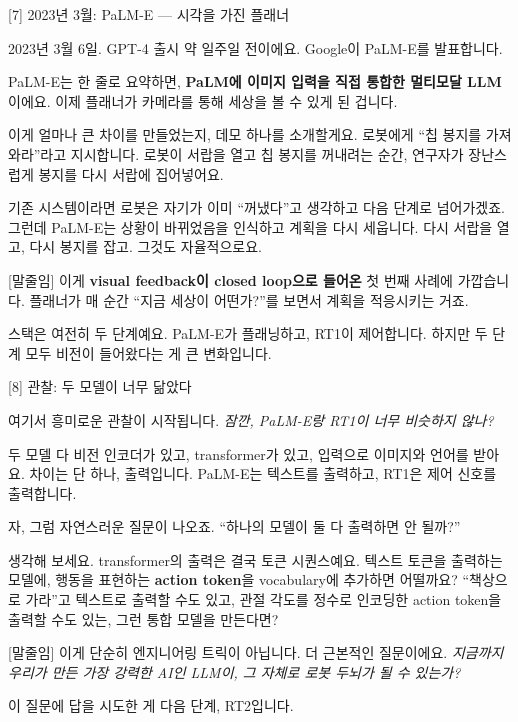 \documentclass[aspectratio=169,10pt]{beamer}
\newenvironment{script}{%
  \footnotesize
  \setlength{\parskip}{0.5em}
  \setlength{\parindent}{0pt}
}{}
\begin{document}
\begin{frame}{[7] 2023년 3월: PaLM-E --- 시각을 가진 플래너}
\begin{script}
2023년 3월 6일. GPT-4 출시 약 일주일 전이에요. Google이 PaLM-E를 발표합니다.

PaLM-E는 한 줄로 요약하면, \textbf{PaLM에 이미지 입력을 직접 통합한 멀티모달 LLM}이에요. 이제 플래너가 카메라를 통해 세상을 볼 수 있게 된 겁니다.

이게 얼마나 큰 차이를 만들었는지, 데모 하나를 소개할게요. 로봇에게 ``칩 봉지를 가져와라''라고 지시합니다. 로봇이 서랍을 열고 칩 봉지를 꺼내려는 순간, 연구자가 장난스럽게 봉지를 다시 서랍에 집어넣어요.

기존 시스템이라면 로봇은 자기가 이미 ``꺼냈다''고 생각하고 다음 단계로 넘어가겠죠. 그런데 PaLM-E는 \alert{상황이 바뀌었음을 인식하고 계획을 다시 세웁니다}. 다시 서랍을 열고, 다시 봉지를 잡고. 그것도 자율적으로요.

[말줄임] 이게 \textbf{visual feedback이 closed loop으로 들어온} 첫 번째 사례에 가깝습니다. 플래너가 매 순간 ``지금 세상이 어떤가?''를 보면서 계획을 적응시키는 거죠.

스택은 여전히 두 단계예요. PaLM-E가 플래닝하고, RT1이 제어합니다. 하지만 두 단계 모두 비전이 들어왔다는 게 큰 변화입니다.
\end{script}
\end{frame}

\begin{frame}{[8] 관찰: 두 모델이 너무 닮았다}
\begin{script}
여기서 흥미로운 관찰이 시작됩니다. \textit{잠깐, PaLM-E랑 RT1이 너무 비슷하지 않나?}

두 모델 다 비전 인코더가 있고, transformer가 있고, 입력으로 이미지와 언어를 받아요. 차이는 단 하나, 출력입니다. PaLM-E는 텍스트를 출력하고, RT1은 제어 신호를 출력합니다.

자, 그럼 자연스러운 질문이 나오죠. \alert{``하나의 모델이 둘 다 출력하면 안 될까?''}

생각해 보세요. transformer의 출력은 결국 토큰 시퀀스예요. 텍스트 토큰을 출력하는 모델에, 행동을 표현하는 \textbf{action token}을 vocabulary에 추가하면 어떨까요? ``책상으로 가라''고 텍스트로 출력할 수도 있고, 관절 각도를 정수로 인코딩한 action token을 출력할 수도 있는, 그런 통합 모델을 만든다면?

[말줄임] 이게 단순히 엔지니어링 트릭이 아닙니다. 더 근본적인 질문이에요. \textit{지금까지 우리가 만든 가장 강력한 AI인 LLM이, 그 자체로 로봇 두뇌가 될 수 있는가?}

이 질문에 답을 시도한 게 다음 단계, RT2입니다.
\end{script}
\end{frame}
\end{document}
